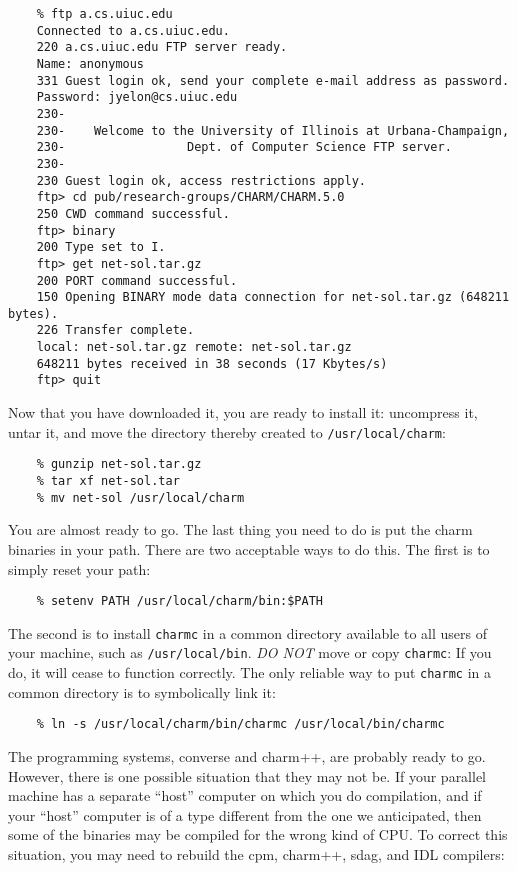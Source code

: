 \begin{verbatim}
    % ftp a.cs.uiuc.edu
    Connected to a.cs.uiuc.edu.
    220 a.cs.uiuc.edu FTP server ready.
    Name: anonymous
    331 Guest login ok, send your complete e-mail address as password.
    Password: jyelon@cs.uiuc.edu
    230-
    230-    Welcome to the University of Illinois at Urbana-Champaign,
    230-                 Dept. of Computer Science FTP server.
    230-
    230 Guest login ok, access restrictions apply.
    ftp> cd pub/research-groups/CHARM/CHARM.5.0
    250 CWD command successful.
    ftp> binary
    200 Type set to I.
    ftp> get net-sol.tar.gz
    200 PORT command successful.
    150 Opening BINARY mode data connection for net-sol.tar.gz (648211 bytes).
    226 Transfer complete.
    local: net-sol.tar.gz remote: net-sol.tar.gz
    648211 bytes received in 38 seconds (17 Kbytes/s)
    ftp> quit
\end{verbatim}

Now that you have downloaded it, you are ready to install it: uncompress it,
untar it, and move the directory thereby created to {\tt /usr/local/charm}:

\begin{verbatim}
    % gunzip net-sol.tar.gz
    % tar xf net-sol.tar
    % mv net-sol /usr/local/charm
\end{verbatim}

You are almost ready to go.  The last thing you need to do is put the
charm binaries in your path.  There are two acceptable ways to do
this.  The first is to simply reset your path:

\begin{verbatim}
    % setenv PATH /usr/local/charm/bin:$PATH
\end{verbatim}

The second is to install {\tt charmc} in a common directory available
to all users of your machine, such as {\tt /usr/local/bin}.  {\em DO
NOT} move or copy {\tt charmc}: If you do, it will cease to function correctly.
The only reliable way to
put {\tt charmc} in a common directory is to symbolically link it:

\begin{verbatim}
    % ln -s /usr/local/charm/bin/charmc /usr/local/bin/charmc
\end{verbatim}

The programming systems, converse and charm++, are
probably ready to go.  However, there is one possible situation that
they may not be.  If your parallel machine has a separate ``host''
computer on which you do compilation, and if your ``host'' computer is
of a type different from the one we anticipated, then some of the
binaries may be compiled for the wrong kind of CPU.  To correct this
situation, you may need to rebuild the cpm, charm++, sdag, and IDL  compilers:

